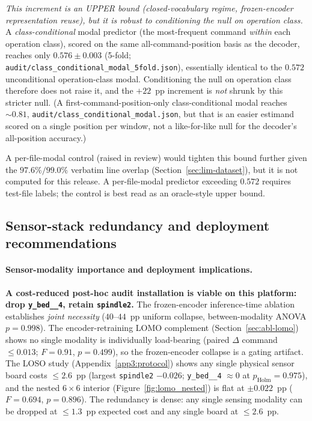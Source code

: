 \documentclass[sensors,article,submit,moreauthors,pdftex]{Definitions/mdpi}
\begin{document}
\emph{This increment is an UPPER bound (closed-vocabulary regime, frozen-encoder representation reuse), but it is robust to conditioning the null on operation class.} A \emph{class-conditional} modal predictor (the most-frequent command \emph{within} each operation class), scored on the same all-command-position basis as the decoder, reaches only $0.576 \pm 0.003$ (5-fold; \texttt{audit/class\_conditional\_modal\_5fold.json}), essentially identical to the $0.572$ unconditional operation-class modal. Conditioning the null on operation class therefore does not raise it, and the $+22$~pp increment is \emph{not} shrunk by this stricter null. (A first-command-position-only class-conditional modal reaches $\sim\!0.81$, \texttt{audit/class\_conditional\_modal.json}, but that is an easier estimand scored on a single position per window, not a like-for-like null for the decoder's all-position accuracy.)

A per-file-modal control (raised in review) would tighten this bound further given the $97.6\%/99.0\%$ verbatim line overlap (Section~\ref{sec:lim-dataset}), but it is not computed for this release. A per-file-modal predictor exceeding $0.572$ requires test-file labels; the control is best read as an oracle-style upper bound.

\subsection{Sensor-stack redundancy and deployment recommendations}
\label{sec:disc-deployment-stack}

\paragraph{Sensor-modality importance and deployment implications.}\label{sec:disc-modality}\hspace*{0pt plus 1fill}

\textbf{A cost-reduced post-hoc audit installation is viable on this platform: drop \texttt{y\_bed\_\_4}, retain \texttt{spindle2}.} The frozen-encoder inference-time ablation establishes \emph{joint necessity} ($40$--$44$~pp uniform collapse, between-modality ANOVA $p\!=\!0.998$). The encoder-retraining LOMO complement (Section~\ref{sec:abl-lomo}) shows no single modality is individually load-bearing (paired $\Delta$ command $\le\!0.013$; $F\!=\!0.91$, $p\!=\!0.499$), so the frozen-encoder collapse is a gating artifact. The LOSO study (Appendix~\ref{app3:protocol}) shows any single physical sensor board costs $\le\!2.6$~pp (largest \texttt{spindle2} $-0.026$; \texttt{y\_bed\_\_4} $\approx\!0$ at $p_{\text{Holm}}\!=\!0.975$), and the nested $6\!\times\!6$ interior (Figure~\ref{fig:lomo_nested}) is flat at $\pm0.022$~pp ($F\!=\!0.694$, $p\!=\!0.896$). The redundancy is dense: any single sensing modality can be dropped at $\le\!1.3$~pp expected cost and any single board at $\le\!2.6$~pp.
\end{document}
